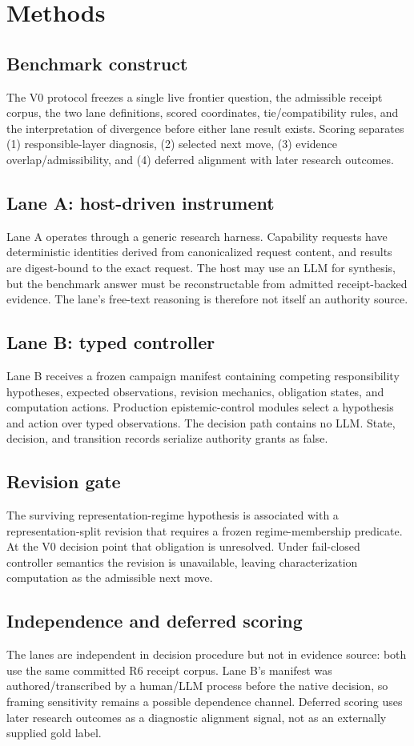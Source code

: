 \section{Methods}

\subsection{Benchmark construct}
The V0 protocol freezes a single live frontier question, the admissible receipt corpus, the two lane definitions, scored coordinates, tie/compatibility rules, and the interpretation of divergence before either lane result exists. Scoring separates (1) responsible-layer diagnosis, (2) selected next move, (3) evidence overlap/admissibility, and (4) deferred alignment with later research outcomes.

\subsection{Lane A: host-driven instrument}
Lane A operates through a generic research harness. Capability requests have deterministic identities derived from canonicalized request content, and results are digest-bound to the exact request. The host may use an LLM for synthesis, but the benchmark answer must be reconstructable from admitted receipt-backed evidence. The lane's free-text reasoning is therefore not itself an authority source.

\subsection{Lane B: typed controller}
Lane B receives a frozen campaign manifest containing competing responsibility hypotheses, expected observations, revision mechanics, obligation states, and computation actions. Production epistemic-control modules select a hypothesis and action over typed observations. The decision path contains no LLM. State, decision, and transition records serialize authority grants as false.

\subsection{Revision gate}
The surviving representation-regime hypothesis is associated with a representation-split revision that requires a frozen regime-membership predicate. At the V0 decision point that obligation is unresolved. Under fail-closed controller semantics the revision is unavailable, leaving characterization computation as the admissible next move.

\subsection{Independence and deferred scoring}
The lanes are independent in decision procedure but not in evidence source: both use the same committed R6 receipt corpus. Lane B's manifest was authored/transcribed by a human/LLM process before the native decision, so framing sensitivity remains a possible dependence channel. Deferred scoring uses later research outcomes as a diagnostic alignment signal, not as an externally supplied gold label.
